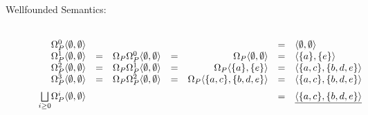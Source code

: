 \begin{Loesung}
\begin{UList}
\begin{description}
\item[Wellfounded Semantics:] ~\\
  \(
  \begin{array}[t]{rcrcrcl}
    \Omega^0_P\langle \emptyset,\emptyset\rangle & & & & & = &
    \langle\emptyset,\emptyset\rangle \\
    \Omega^1_P\langle \emptyset,\emptyset\rangle & = & 
    \Omega_P\Omega^0_P\langle \emptyset,\emptyset\rangle & = &
    \Omega_P\langle \emptyset,\emptyset\rangle & = & 
    \langle\{a\},\{e\}\rangle \\
    \Omega^2_P\langle \emptyset,\emptyset\rangle & = & 
    \Omega_P\Omega^1_P\langle \emptyset,\emptyset\rangle & = &
    \Omega_P\langle \{a\},\{e\}\rangle & = & 
    \langle\{a,c\},\{b,d,e\}\rangle \\
    \Omega^3_P\langle \emptyset,\emptyset\rangle & = & 
    \Omega_P\Omega^2_P\langle \emptyset,\emptyset\rangle & = &
    \Omega_P\langle \{a,c\},\{b,d,e\}\rangle & = & 
    \langle\{a,c\},\{b,d,e\}\rangle \\[2mm]
    \underset{i\geq 0}{\bigsqcup}\Omega^i_P\langle \emptyset,\emptyset\rangle 
    & & & & & = & \underline{\langle\{a,c\},\{b,d,e\}\rangle}
  \end{array}
  \)
%
\end{description}
%
\item
\begin{description}


\end{description}
\end{UList}
\end{Loesung}
